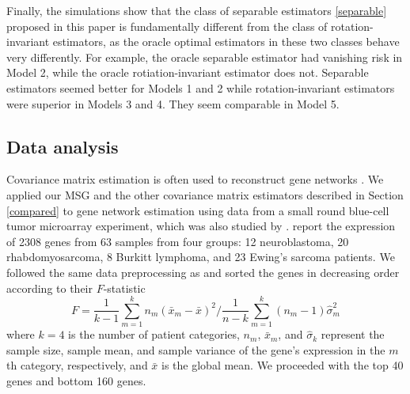 
Finally, the simulations show that the class of separable estimators \eqref{separable} proposed in this paper is fundamentally different from the class of rotation-invariant estimators, as the oracle optimal estimators in these two classes behave very differently. For example, the oracle separable estimator had vanishing risk in Model 2, while the oracle rotiation-invariant estimator does not. Separable estimators seemed better for Models 1 and 2 while rotation-invariant estimators were superior in Models 3 and 4. They seem comparable in Model 5.

\subsection{Data analysis}
\label{gene analysis}
Covariance matrix estimation is often used to reconstruct gene networks \citep{markowetz2007inferring}. We applied our MSG and the other covariance matrix estimators described in Section \ref{compared} to gene network estimation using data from a small round blue-cell tumor microarray experiment, which was also studied by \citet{cai2011adaptive}. \citet{osareh2009classification} report the expression of 2308 genes from 63 samples from four groups: 12 neuroblastoma, 20 rhabdomyosarcoma, 8 Burkitt lymphoma, and 23 Ewing's sarcoma patients. We followed the same data preprocessing as \citet{cai2011adaptive} and sorted the genes in decreasing order according to their $F$-statistic
\begin{equation}
F = \frac{1}{k-1}\sum_{m=1}^kn_m(\bar{x}_m - \bar{x})^2 /   \frac{1}{n-k}\sum_{m=1}^k (n_m-1)\hat{\sigma}_m^2 
\end{equation}
where $k = 4$ is the number of patient categories, $n_m$, $\bar{x}_m$, and $\hat{\sigma}_k$ represent the sample size, sample mean, and sample variance of the gene's expression in the $m$th category, respectively, and $\bar{x}$ is the global mean. We proceeded with the top 40 genes and bottom 160 genes.

